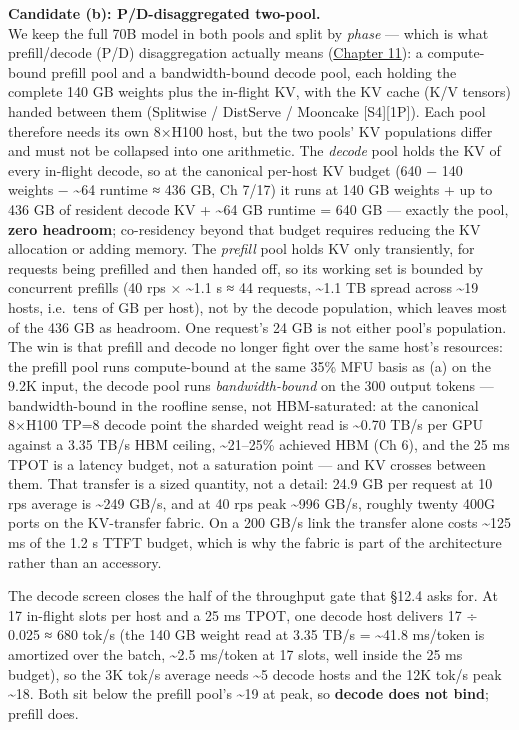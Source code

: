 \textbf{Candidate (b): P/D-disaggregated two-pool.}\\
We keep the full 70B model in both pools and split by \emph{phase} ---
which is what prefill/decode (P/D) disaggregation actually means
(\hyperref[chap:11]{Chapter 11}): a compute-bound prefill pool and a bandwidth-bound decode
pool, each holding the complete 140 GB weights plus the in-flight KV,
with the KV cache (K/V tensors) handed between them (Splitwise /
DistServe / Mooncake \mbox{{[}S4{]}}\hspace{0pt}\mbox{{[}1P{]}}). Each pool therefore needs its
own 8×H100 host, but the two pools' KV populations differ and must not
be collapsed into one arithmetic. The \emph{decode} pool holds the KV of
every in-flight decode, so at the canonical per-host KV budget (640 −
140 weights − \textasciitilde64 runtime ≈ 436 GB, Ch 7/17) it runs at
140 GB weights + up to 436 GB of resident decode KV + \textasciitilde64
GB runtime = 640 GB --- exactly the pool, \textbf{zero headroom};
co-residency beyond that budget requires reducing the KV allocation or
adding memory. The \emph{prefill} pool holds KV only transiently, for
requests being prefilled and then handed off, so its working set is
bounded by concurrent prefills (40 rps × \textasciitilde1.1 s ≈ 44
requests, \textasciitilde1.1 TB spread across \textasciitilde19 hosts,
i.e.~tens of GB per host), not by the decode population, which leaves
most of the 436 GB as headroom. One request's 24 GB is not either pool's
population. The win is that prefill and decode no longer fight over the
same host's resources: the prefill pool runs compute-bound at the same
35\% MFU basis as (a) on the 9.2K input, the decode pool runs
\emph{bandwidth-bound} on the 300 output tokens --- bandwidth-bound in
the roofline sense, not HBM-saturated: at the canonical 8×H100 TP=8
decode point the sharded weight read is \textasciitilde0.70 TB/s per GPU
against a 3.35 TB/s HBM ceiling, \textasciitilde21--25\% achieved HBM
(Ch 6), and the 25 ms TPOT is a latency budget, not a saturation point
--- and KV crosses between them. That transfer is a sized quantity, not
a detail: 24.9 GB per request at 10 rps average is \textasciitilde249
GB/s, and at 40 rps peak \textasciitilde996 GB/s, roughly twenty 400G
ports on the KV-transfer fabric. On a 200 GB/s link the transfer alone
costs \textasciitilde125 ms of the 1.2 s TTFT budget, which is why the
fabric is part of the architecture rather than an accessory.

The decode screen closes the half of the throughput gate that §12.4 asks
for. At 17 in-flight slots per host and a 25 ms TPOT, one decode host
delivers 17 ÷ 0.025 ≈ 680 tok/s (the 140 GB weight read at 3.35 TB/s =
\textasciitilde41.8 ms/token is amortized over the batch,
\textasciitilde2.5 ms/token at 17 slots, well inside the 25 ms budget),
so the 3K tok/s average needs \textasciitilde5 decode hosts and the 12K
tok/s peak \textasciitilde18. Both sit below the prefill pool's
\textasciitilde19 at peak, so \textbf{decode does not bind}; prefill
does.

